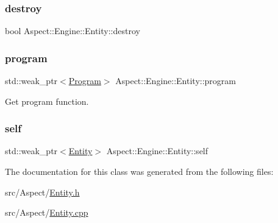 \subsubsection{\texorpdfstring{destroy}{destroy}}
{\footnotesize\ttfamily bool Aspect\+::\+Engine\+::\+Entity\+::destroy}

\mbox{\label{class_aspect_1_1_engine_1_1_entity_a39a0c787c384f192878e9c16f566b892}} 
\subsubsection{\texorpdfstring{program}{program}}
{\footnotesize\ttfamily std\+::weak\+\_\+ptr$<$\mbox{\hyperlink{class_aspect_1_1_engine_1_1_program}{Program}}$>$ Aspect\+::\+Engine\+::\+Entity\+::program}



Get program function. 

\mbox{\label{class_aspect_1_1_engine_1_1_entity_a23ba239d52c76b8c7f86a4ebdd189d26}} 
\subsubsection{\texorpdfstring{self}{self}}
{\footnotesize\ttfamily std\+::weak\+\_\+ptr$<$\mbox{\hyperlink{class_aspect_1_1_engine_1_1_entity}{Entity}}$>$ Aspect\+::\+Engine\+::\+Entity\+::self}



The documentation for this class was generated from the following files\+:\begin{DoxyCompactItemize}
\item 
src/\+Aspect/\mbox{\hyperlink{_entity_8h}{Entity.\+h}}\item 
src/\+Aspect/\mbox{\hyperlink{_entity_8cpp}{Entity.\+cpp}}\end{DoxyCompactItemize}
